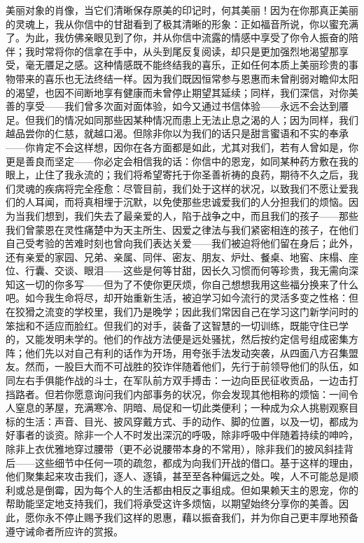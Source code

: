 美丽对象的肖像，当它们清晰保存原美的印记时，何其美丽！因为在你那真正美丽的灵魂上，我从你信中的甘甜看到了极其清晰的形象：正如福音所说，你以蜜充满了。为此，我仿佛亲眼见到了你，并从你信中流露的情感中享受了你令人振奋的陪伴；我时常将你的信拿在手中，从头到尾反复阅读，却只是更加强烈地渴望那享受，毫无餍足之感。这种情感既不能终结我的喜乐，正如任何本质上美丽珍贵的事物带来的喜乐也无法终结一样。因为我们既因恒常参与恩惠而未曾削弱对瞻仰太阳的渴望，也因不间断地享有健康而未曾停止期望其延续；同样，我们深信，对你美善的享受——我们曾多次面对面体验，如今又通过书信体验——永远不会达到餍足。但我们的情况如同那些因某种情况而患上无法止息之渴的人；因为同样，我们越品尝你的仁慈，就越口渴。但除非你以为我们的话只是甜言蜜语和不实的奉承——你肯定不会这样想，因你在各方面都是如此，尤其对我们，若有人曾如是，你更是善良而坚定——你必定会相信我的话：你信中的恩宠，如同某种药方敷在我的眼上，止住了我永流的；我们将希望寄托于你圣善祈祷的良药，期待不久之后，我们灵魂的疾病将完全痊愈：尽管目前，我们处于这样的状况，以致我们不愿让爱我们的人耳闻，而将真相埋于沉默，以免使那些忠诚爱我们的人分担我们的烦恼。因为当我们想到，我们失去了最亲爱的人，陷于战争之中，而且我们的孩子——那些我们曾蒙恩在灵性痛楚中为天主所生、因爱之律法与我们紧密相连的孩子，在他们自己受考验的苦难时刻也曾向我们表达关爱——我们被迫将他们留在身后；此外，还有亲爱的家园、兄弟、亲属、同伴、密友、朋友、炉灶、餐桌、地窖、床榻、座位、行囊、交谈、眼泪——这些是何等甘甜，因长久习惯而何等珍贵，我无需向深知这一切的你多写——但为了不使你更厌烦，你自己想想我用这些福分换来了什么吧。如今我生命将尽，却开始重新生活，被迫学习如今流行的灵活多变之性格：但在狡猾之流变的学校里，我们乃是晚学；因此我们常因自己在学习这门新学问时的笨拙和不适应而脸红。但我们的对手，装备了这智慧的一切训练，既能守住已学的，又能发明未学的。他们的作战方法便是远处骚扰，然后按约定信号组成密集方阵；他们先以对自己有利的话作为开场，用夸张手法发动突袭，从四面八方召集盟友。然而，一股巨大而不可战胜的狡诈伴随着他们，先行于前领导他们的队伍，如同左右手俱能作战的斗士，在军队前方双手搏击：一边向臣民征收贡品，一边击打挡路者。但若你愿意询问我们内部事务的状况，你会发现其他相称的烦恼：一间令人窒息的茅屋，充满寒冷、阴暗、局促和一切此类便利；一种成为众人挑剔观察目标的生活：声音、目光、披风穿戴方式、手的动作、脚的位置，以及一切，都成为好事者的谈资。除非一个人不时发出深沉的呼吸，除非呼吸中伴随着持续的呻吟，除非上衣优雅地穿过腰带（更不必说腰带本身的不常用），除非我们的披风斜挂背后——这些细节中任何一项的疏忽，都成为向我们开战的借口。基于这样的理由，他们聚集起来攻击我们，逐人、逐镇，甚至至各种偏远之处。唉，人不可能总是顺利或总是倒霉，因为每个人的生活都由相反之事组成。但如果赖天主的恩宠，你的帮助能坚定地支持我们，我们将承受这许多烦恼，以期望始终分享你的美善。因此，愿你永不停止赐予我们这样的恩惠，藉以振奋我们，并为你自己更丰厚地预备遵守诫命者所应许的赏报。\par

